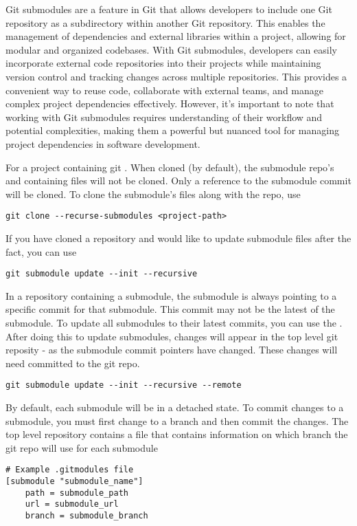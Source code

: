 Git submodules are a feature in Git that allows developers to include one Git repository as a subdirectory within another Git repository. This enables the management of dependencies and external libraries within a project, allowing for modular and organized codebases. With Git submodules, developers can easily incorporate external code repositories into their projects while maintaining version control and tracking changes across multiple repositories. This provides a convenient way to reuse code, collaborate with external teams, and manage complex project dependencies effectively. However, it's important to note that working with Git submodules requires understanding of their workflow and potential complexities, making them a powerful but nuanced tool for managing project dependencies in software development.

\myindent For a project containing git . When cloned (by default), the submodule repo's and containing files will not be cloned. Only a reference to the submodule commit will be cloned. To clone the submodule's files along with the repo, use
\begin{lstlisting}[style=terminalstyle]
git clone --recurse-submodules <project-path>
\end{lstlisting}

If you have cloned a repository and would like to update submodule files after the fact, you can use
\begin{lstlisting}[style=terminalstyle]
git submodule update --init --recursive
\end{lstlisting}

In a repository containing a submodule, the submodule is always pointing to a specific commit for that submodule. This commit may not be the latest of the submodule. To update all submodules to their latest commits, you can use the . After doing this to update submodules, changes will appear in the top level git reposity - as the submodule commit pointers have changed. These changes will need committed to the git repo.
\begin{lstlisting}[style=terminalstyle]
git submodule update --init --recursive --remote
\end{lstlisting}

By default, each submodule will be in a detached  state. To commit changes to a submodule, you must first change to a branch and then commit the changes. The top level repository contains a  file that contains information on which branch the git repo will use for each submodule
\begin{lstlisting}
# Example .gitmodules file
[submodule "submodule_name"]
    path = submodule_path
    url = submodule_url
    branch = submodule_branch
\end{lstlisting}

